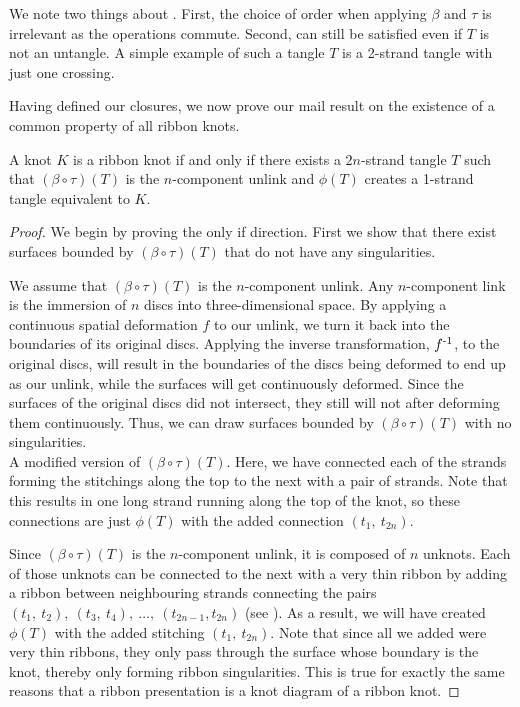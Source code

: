 \begin{paper}
We note two things about \eqUnlink.
First, the choice of order when applying $\beta$ and $\tau$ is irrelevant as the
operations commute.
Second, \eqUnlink can still be satisfied even if $T$ is not an untangle.
A simple example of such a tangle $T$ is a 2-strand tangle with just one
crossing.

Having defined our closures, we now prove our mail result on the existence of a
common property of all ribbon knots.

{A knot $K$ is a ribbon knot if and only if there exists a $2n$-strand tangle
$T$ such that $(\beta\circ\tau)(T)$ is the $n$-component unlink and $\phi(T)$
creates a 1-strand tangle equivalent to $K$.}
\begin{proof}
We begin by proving the only if direction.
First we show that there exist surfaces bounded by $(\beta\circ\tau)(T)$ that do
not have any singularities.

We assume that $(\beta\circ\tau)(T)$ is the $n$-component unlink.
Any $n$-component link is the immersion of $n$ discs into three-dimensional
space.
By applying a continuous spatial deformation $f$ to our unlink, we turn it back
into the boundaries of its original discs.
Applying the inverse transformation, $f^{\text-1}$, to the original discs, will
result in the boundaries of the discs being deformed to end up as our unlink,
while the surfaces will get continuously deformed.
Since the surfaces of the original discs did not intersect, they still will not
after deforming them continuously.
Thus, we can draw surfaces bounded by $(\beta\circ\tau)(T)$ with no
singularities.\\

{A modified version of $(\beta\circ\tau)(T)$.
Here, we have connected each of the strands forming the stitchings along the top
to the next with a pair of strands.
Note that this results in one long strand running along the top of the knot, so
these connections are just $\phi(T)$ with the added connection $(t_1,~t_{2n})$.}

Since $(\beta\circ\tau)(T)$ is the $n$-component unlink, it is composed of $n$
unknots.
Each of those unknots can be connected to the next with a very thin ribbon by
adding a ribbon between neighbouring strands connecting the pairs
$(t_1,~t_2),~(t_3,~t_4),~\dots,~(t_{2n-1},t_{2n})$ (see \figProof).
As a result, we will have created $\phi(T)$ with the added stitching
$(t_1,~t_{2n})$.
Note that since all we added were very thin ribbons, they only pass through the
surface whose boundary is the knot, thereby only forming ribbon singularities.
This is true for exactly the same reasons that a ribbon presentation is a knot
diagram of a ribbon knot.


\end{proof}
\end{paper}
